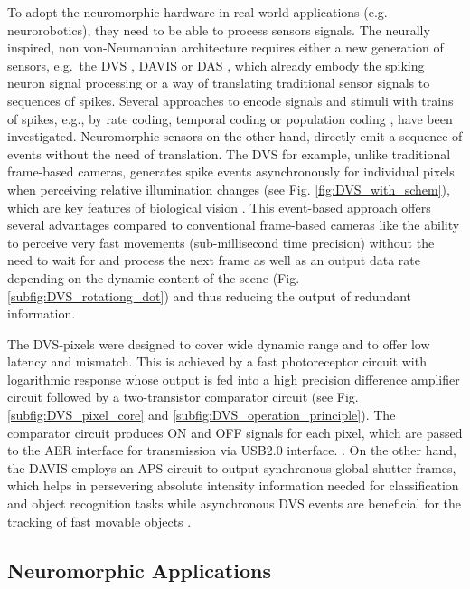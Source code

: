 To adopt the neuromorphic hardware in real-world applications (e.g. neurorobotics), they need to be able to process sensors signals.
The neurally inspired, non von-Neumannian architecture requires either a new generation of sensors, e.g.\ the \ac{DVS} \cite{Lichtsteiner2008}, \ac{DAVIS} \cite{Brandli2014} or \ac{DAS} \cite{Liu2014}, which already embody the spiking neuron signal processing or a way of translating traditional sensor signals to sequences of spikes.
Several approaches to encode signals and stimuli with trains of spikes, e.g., by rate coding, temporal coding \cite[Chap. 7.6]{Gerstner2014} or population coding \cite[Chap. 1]{Gerstner2002}, \cite{Ponulak2011} have been investigated.
Neuromorphic sensors on the other hand, directly emit a sequence of events without the need of translation.
The \ac{DVS} for example, unlike traditional frame-based cameras, generates spike events \cite{Lichtsteiner2008} asynchronously for individual pixels when perceiving relative illumination changes (see Fig. \ref{fig:DVS_with_schem}), which are key features of biological vision \cite{Lichtsteiner2008}.
This event-based approach offers several advantages compared to conventional frame-based cameras like the ability to perceive very fast movements (sub-millisecond time precision) without the need to wait for and process the next frame as well as an output data rate depending on the dynamic content of the scene (Fig. \ref{subfig:DVS_rotationg_dot}) and thus reducing the output of redundant information.

The \ac{DVS}-pixels were designed to cover wide dynamic range and to offer low latency and mismatch.
This is achieved by a fast photoreceptor circuit with logarithmic response whose output is fed into a high precision difference amplifier circuit followed by a two-transistor comparator circuit (see Fig. \ref{subfig:DVS_pixel_core} and \ref{subfig:DVS_operation_principle}).
The comparator circuit produces ON and OFF signals for each pixel, which are passed to the \ac{AER} interface for transmission via USB2.0 interface. \cite{Lichtsteiner2008}.
On the other hand, the \ac{DAVIS} employs an \ac{APS} circuit to output synchronous global shutter frames, which helps in persevering absolute intensity information needed for classification and object recognition tasks while asynchronous \ac{DVS} events are beneficial for the tracking of fast movable objects \cite{Brandli2014}.


\subsection{Neuromorphic Applications}
\label{subsec:neuro_applic}

